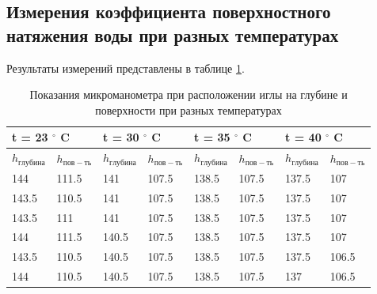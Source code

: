 \documentclass[a4paper,12pt]{article} %
\begin{document}
\subsection*{Измерения коэффициента поверхностного натяжения воды при разных температурах}
Результаты измерений представлены в таблице \ref{данные}.

\begin{table}[h!]
\caption{Показания микроманометра при расположении иглы на глубине и поверхности при разных температурах}
\label{данные}
\begin{tabular}{|ll|ll|ll|ll|}
\hline
\multicolumn{2}{|l|}{t = 23 $^\circ$ C}            & \multicolumn{2}{l|}{t = 30 $^\circ$ C}            & \multicolumn{2}{l|}{t = 35 $^\circ$ C}            & \multicolumn{2}{l|}{t = 40 $^\circ$ C}            \\ \hline
\multicolumn{1}{|l|}{$h_{глубина}$} & $h_{пов-ть}$ & \multicolumn{1}{l|}{$h_{глубина}$} & $h_{пов-ть}$ & \multicolumn{1}{l|}{$h_{глубина}$} & $h_{пов-ть}$ & \multicolumn{1}{l|}{$h_{глубина}$} & $h_{пов-ть}$ \\ \hline
\multicolumn{1}{|l|}{144}           & 111.5        & \multicolumn{1}{l|}{141}           & 107.5        & \multicolumn{1}{l|}{138.5}         & 107.5        & \multicolumn{1}{l|}{137.5}         & 107          \\ \hline
\multicolumn{1}{|l|}{143.5}         & 110.5        & \multicolumn{1}{l|}{141}           & 107.5        & \multicolumn{1}{l|}{138.5}         & 107.5        & \multicolumn{1}{l|}{137.5}         & 107          \\ \hline
\multicolumn{1}{|l|}{143.5}         & 111          & \multicolumn{1}{l|}{141}           & 107.5        & \multicolumn{1}{l|}{138.5}         & 107.5        & \multicolumn{1}{l|}{137.5}         & 107          \\ \hline
\multicolumn{1}{|l|}{144}           & 111.5        & \multicolumn{1}{l|}{140.5}         & 107.5        & \multicolumn{1}{l|}{138.5}         & 107.5        & \multicolumn{1}{l|}{137.5}         & 107          \\ \hline
\multicolumn{1}{|l|}{143.5}         & 110.5        & \multicolumn{1}{l|}{140.5}         & 107.5        & \multicolumn{1}{l|}{138.5}         & 107.5        & \multicolumn{1}{l|}{137.5}         & 106.5        \\ \hline
\multicolumn{1}{|l|}{144}           & 110.5        & \multicolumn{1}{l|}{140.5}         & 107.5        & \multicolumn{1}{l|}{138.5}         & 107.5        & \multicolumn{1}{l|}{137}           & 106.5        \\ \hline

\end{tabular}
\end{table}
\end{document}
